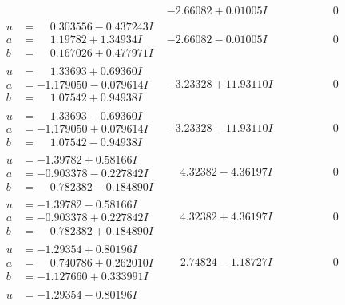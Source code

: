 \documentclass[1p]{elsarticle_modified}
\theoremstyle{definition}
\begin{document}
$$\begin{array}{c|c|c}
 & -2.66082 + 0.01005 I & \phantom{-0.000000 } 0 \\ \hline\begin{aligned}
u &= \phantom{-}0.303556 - 0.437243 I \\
a &= \phantom{-}1.19782 + 1.34934 I \\
b &= \phantom{-}0.167026 + 0.477971 I\end{aligned}
 & -2.66082 - 0.01005 I & \phantom{-0.000000 } 0 \\ \hline\begin{aligned}
u &= \phantom{-}1.33693 + 0.69360 I \\
a &= -1.179050 - 0.079614 I \\
b &= \phantom{-}1.07542 + 0.94938 I\end{aligned}
 & -3.23328 + 11.93110 I & \phantom{-0.000000 } 0 \\ \hline\begin{aligned}
u &= \phantom{-}1.33693 - 0.69360 I \\
a &= -1.179050 + 0.079614 I \\
b &= \phantom{-}1.07542 - 0.94938 I\end{aligned}
 & -3.23328 - 11.93110 I & \phantom{-0.000000 } 0 \\ \hline\begin{aligned}
u &= -1.39782 + 0.58166 I \\
a &= -0.903378 - 0.227842 I \\
b &= \phantom{-}0.782382 - 0.184890 I\end{aligned}
 & \phantom{-}4.32382 - 4.36197 I & \phantom{-0.000000 } 0 \\ \hline\begin{aligned}
u &= -1.39782 - 0.58166 I \\
a &= -0.903378 + 0.227842 I \\
b &= \phantom{-}0.782382 + 0.184890 I\end{aligned}
 & \phantom{-}4.32382 + 4.36197 I & \phantom{-0.000000 } 0 \\ \hline\begin{aligned}
u &= -1.29354 + 0.80196 I \\
a &= \phantom{-}0.740786 + 0.262010 I \\
b &= -1.127660 + 0.333991 I\end{aligned}
 & \phantom{-}2.74824 - 1.18727 I & \phantom{-0.000000 } 0 \\ \hline\begin{aligned}
u &= -1.29354 - 0.80196 I \\

\end{aligned}
\end{array}$$
\end{document}
